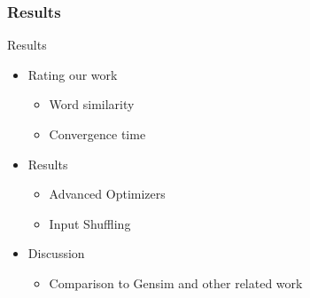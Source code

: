 \begin{frame}\frametitle{Results}
\begin{Large}
Results
\end{Large}
\begin{itemize}
\item Rating our work
\begin{itemize}
\item Word similarity 
\item Convergence time
\end{itemize}
\item Results
\begin{itemize}
\item Advanced Optimizers
\item Input Shuffling
\end{itemize}
\item Discussion
\begin{itemize}
\item Comparison to Gensim and other related work
\end{itemize}
\end{itemize}
\end{frame}


